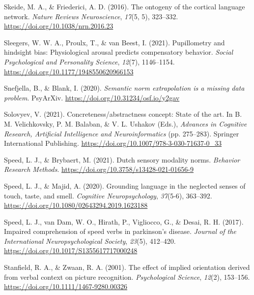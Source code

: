 \documentclass[
  12pt,
  man,floatsintext]{apa7}
\newlength{\cslhangindent}
\newlength{\cslentryspacingunit} %
\newenvironment{CSLReferences}[2] %
 {%
  \setlength{\parindent}{0pt}
  \ifodd #1
  \let\oldpar\par
  \def\par{\hangindent=\cslhangindent\oldpar}
  \fi
  \setlength{\parskip}{#2\cslentryspacingunit}
 }%
 {}
\begin{document}
\begin{CSLReferences}{1}{0}
\leavevmode{}%
Skeide, M. A., \& Friederici, A. D. (2016). The ontogeny of the cortical language network. \emph{Nature Reviews Neuroscience}, \emph{17}(5, 5), 323--332. \url{https://doi.org/10.1038/nrn.2016.23}

\leavevmode{}%
Sleegers, W. W. A., Proulx, T., \& van Beest, I. (2021). Pupillometry and hindsight bias: Physiological arousal predicts compensatory behavior. \emph{Social Psychological and Personality Science}, \emph{12}(7), 1146--1154. \url{https://doi.org/10.1177/1948550620966153}

\leavevmode{}%
Snefjella, B., \& Blank, I. (2020). \emph{Semantic norm extrapolation is a missing data problem}. {PsyArXiv}. \url{https://doi.org/10.31234/osf.io/y2gav}

\leavevmode{}%
Solovyev, V. (2021). Concreteness/abstractness concept: State of the art. In B. M. Velichkovsky, P. M. Balaban, \& V. L. Ushakov (Eds.), \emph{Advances in {Cognitive Research}, {Artificial Intelligence} and {Neuroinformatics}} (pp. 275--283). {Springer International Publishing}. \url{https://doi.org/10.1007/978-3-030-71637-0_33}

\leavevmode{}%
Speed, L. J., \& Brybaert, M. (2021). Dutch sensory modality norms. \emph{Behavior Research Methods}. \url{https://doi.org/10.3758/s13428-021-01656-9}

\leavevmode{}%
Speed, L. J., \& Majid, A. (2020). Grounding language in the neglected senses of touch, taste, and smell. \emph{Cognitive Neuropsychology}, \emph{37}(5-6), 363--392. \url{https://doi.org/10.1080/02643294.2019.1623188}

\leavevmode{}%
Speed, L. J., van Dam, W. O., Hirath, P., Vigliocco, G., \& Desai, R. H. (2017). Impaired comprehension of speed verbs in parkinson's disease. \emph{Journal of the International Neuropsychological Society}, \emph{23}(5), 412--420. \url{https://doi.org/10.1017/S1355617717000248}

\leavevmode{}%
Stanfield, R. A., \& Zwaan, R. A. (2001). The effect of implied orientation derived from verbal context on picture recognition. \emph{Psychological Science}, \emph{12}(2), 153--156. \url{https://doi.org/10.1111/1467-9280.00326}


\end{CSLReferences}
\end{document}
